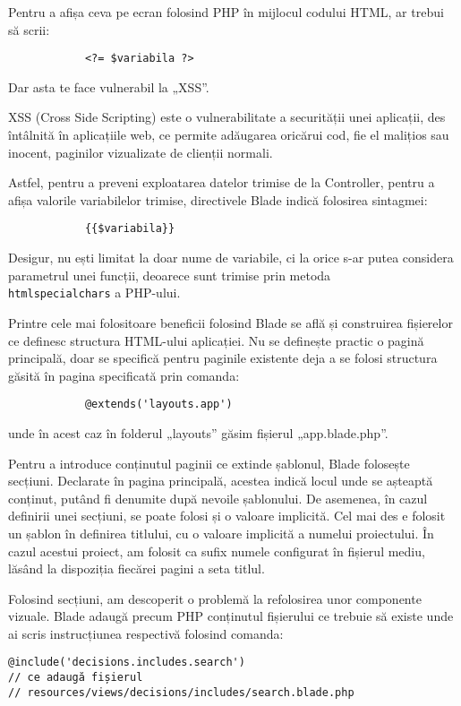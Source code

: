		Pentru a afișa ceva pe ecran folosind PHP în mijlocul codului HTML, ar trebui să scrii:
			\begin{Verbatim}
			<?= $variabila ?>
			\end{Verbatim}
		Dar asta te face vulnerabil la „XSS”.

		XSS (Cross Side Scripting) este o vulnerabilitate a securității unei aplicații, des întâlnită în aplicațiile web, ce permite adăugarea oricărui cod, fie el malițios sau inocent, paginilor vizualizate de clienții normali.

		Astfel, pentru a preveni exploatarea datelor trimise de la Controller, pentru a afișa valorile variabilelor trimise, directivele Blade indică folosirea sintagmei:
			\begin{Verbatim}
			{{$variabila}}
			\end{Verbatim}

		Desigur, nu ești limitat la doar nume de variabile, ci la orice s-ar putea considera parametrul unei funcții, deoarece sunt trimise prin metoda \\
		\verb|htmlspecialchars| a PHP-ului.

		Printre cele mai folositoare beneficii folosind Blade se află și construirea fișierelor ce definesc structura HTML-ului aplicației.
		Nu se definește practic o pagină principală, doar se specifică pentru paginile existente deja a se folosi structura găsită în pagina specificată prin comanda:
		\begin{Verbatim}
			@extends('layouts.app')
		\end{Verbatim}
		unde în acest caz în folderul „layouts” găsim fișierul „app.blade.php”.

		Pentru a introduce conținutul paginii ce extinde șablonul, Blade folosește secțiuni.
		Declarate în pagina principală, acestea indică locul unde se așteaptă conținut, putând fi denumite după nevoile șablonului.
		De asemenea, în cazul definirii unei secțiuni, se poate folosi și o valoare implicită.
		Cel mai des e folosit un șablon în definirea titlului, cu o valoare implicită a numelui proiectului.
		În cazul acestui proiect, am folosit ca sufix numele configurat în fișierul mediu, lăsând la dispoziția fiecărei pagini a seta titlul.

		Folosind secțiuni, am descoperit o problemă la refolosirea unor componente vizuale.
		Blade adaugă precum PHP conținutul fișierului ce trebuie să existe unde ai scris instrucțiunea respectivă folosind comanda:
		\begin{Verbatim}
@include('decisions.includes.search')
// ce adaugă fișierul
// resources/views/decisions/includes/search.blade.php
		\end{Verbatim}

